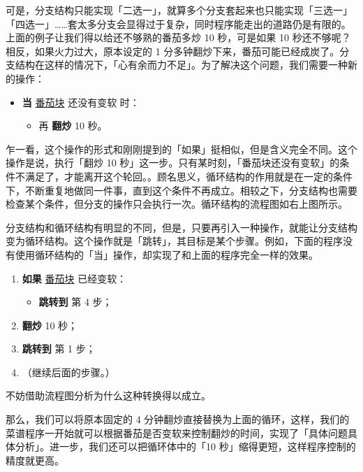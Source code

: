 可是，分支结构只能实现「二选一」，就算多个分支套起来也只能实现「三选一」「四选一」……套太多分支会显得过于复杂，同时程序能走出的道路仍是有限的。上面的例子让我们得以给还不够熟的番茄多炒 10 秒，可是如果 10 秒还不够呢？相反，如果火力过大，原本设定的 1 分多钟翻炒下来，番茄可能已经成炭了。分支结构在这样的情况下，「心有余而力不足」。为了解决这个问题，我们需要一种新的操作：

\begin{itemize}
  \item \textbf{当} \underline{番茄块} 还没有变软 时：
    \begin{itemize}
      \item 再 \textbf{翻炒} 10 秒。
    \end{itemize}
\end{itemize}

乍一看，这个操作的形式和刚刚提到的「如果」挺相似，但是含义完全不同。这个操作是说，执行「翻炒 10 秒」这一步。只有某时刻，「番茄块还没有变软」的条件不满足了，才能离开这个轮回。。顾名思义，循环结构的作用就是在一定的条件下，不断重复地做同一件事，直到这个条件不再成立。相较之下，分支结构也需要检查某个条件，但分支的操作只会执行一次。循环结构的流程图如右上图所示。

\begin{note}
  分支结构和循环结构有明显的不同，但是，只要再引入一种操作，就能让分支结构变为循环结构。这个操作就是「跳转」，其目标是某个步骤。例如，下面的程序没有使用循环结构的「当」操作，却实现了和上面的程序完全一样的效果。
  \begin{enumerate}
    \item \textbf{如果} \underline{番茄块} 已经变软：
      \begin{itemize}
        \item \textbf{跳转到} 第 4 步；
      \end{itemize}
    \item \textbf{翻炒} 10 秒；
    \item \textbf{跳转到} 第 1 步；
    \item （继续后面的步骤。）
  \end{enumerate}

  不妨借助流程图分析为什么这种转换得以成立。
\end{note}

那么，我们可以将原本固定的 4 分钟翻炒直接替换为上面的循环，这样，我们的菜谱程序一开始就可以根据番茄是否变软来控制翻炒的时间，实现了「具体问题具体分析」。进一步，我们还可以把循环体中的「10 秒」缩得更短，这样程序控制的精度就更高。

